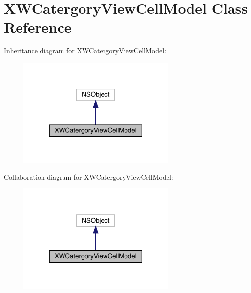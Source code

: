 \hypertarget{interface_x_w_catergory_view_cell_model}{}\section{X\+W\+Catergory\+View\+Cell\+Model Class Reference}
\label{interface_x_w_catergory_view_cell_model}


Inheritance diagram for X\+W\+Catergory\+View\+Cell\+Model\+:\nopagebreak
\begin{figure}[H]
\begin{center}
\leavevmode
\includegraphics[width=222pt]{interface_x_w_catergory_view_cell_model__inherit__graph}
\end{center}
\end{figure}


Collaboration diagram for X\+W\+Catergory\+View\+Cell\+Model\+:\nopagebreak
\begin{figure}[H]
\begin{center}
\leavevmode
\includegraphics[width=222pt]{interface_x_w_catergory_view_cell_model__coll__graph}
\end{center}
\end{figure}
